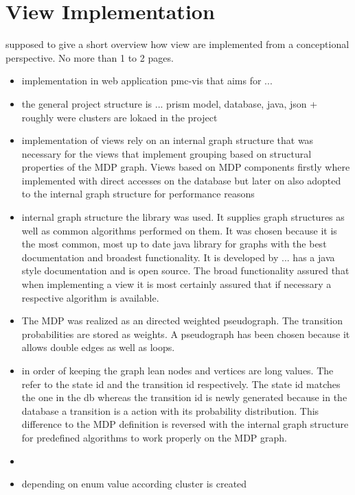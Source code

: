 \documentclass[preview]{standalone}
\begin{document}
\section{View Implementation}
supposed to give a short overview how view are implemented from a conceptional perspective. No more than 1 to 2 pages.
\begin{itemize}
	\item implementation in web application pmc-vis that aims for ...
	\item the general project structure is ... prism model, database, java, json + roughly were clusters are lokaed in the project
	\item implementation of views rely on an internal graph structure that was necessary for the views that implement grouping based on structural properties of the MDP graph. Views based on MDP components firstly where implemented with direct accesses on the database but later on also adopted to the internal graph structure for performance reasons
	\item internal graph structure the \jgrapht library was used. It supplies graph structures as well as common algorithms performed on them. It was chosen because it is the most common, most up to date java library for graphs with the best documentation and broadest functionality. It is developed by ... has a java style documentation and is open source. The broad functionality assured that when implementing a view it is most certainly assured that if necessary a respective algorithm is available.
	\item The MDP was realized as an directed weighted pseudograph. The transition probabilities are stored as weights. A pseudograph has been chosen because it allows double edges as well as loops.
	\item in order of keeping the graph lean nodes and vertices are long values. The refer to the state id and the transition id respectively. The state id matches the one in the db whereas the transition id is newly generated because in the database a transition is a action with its probability distribution. This difference to the MDP definition is reversed with the internal graph structure for predefined algorithms to work properly on the MDP graph.
	\item {}
	\item depending on enum value according cluster is created

\end{itemize}
\end{document}
